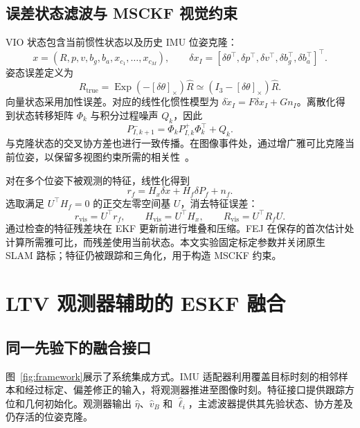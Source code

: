 \documentclass[a4paper,runningheads]{llncs}
\newcommand{\sk}[1]{[#1]_{\times}}
\newcommand{\Exp}{\operatorname{Exp}}
\begin{document}
\subsection{误差状态滤波与 MSCKF 视觉约束}
VIO 状态包含当前惯性状态以及历史 IMU 位姿克隆：
\begin{equation}
 x=(R,p,v,b_g,b_a,x_{c_1},\ldots,x_{c_M}),\qquad
 \delta x_I=[\delta\theta^\top,\delta p^\top,\delta v^\top,
              \delta b_g^\top,\delta b_a^\top]^\top .
\end{equation}
姿态误差定义为
\begin{equation}
 R_{\mathrm{true}}=\Exp(-\sk{\delta\theta})\hat R
       \simeq (I_3-\sk{\delta\theta})\hat R .
 \label{eq:attitudeerror}
\end{equation}
向量状态采用加性误差。对应的线性化惯性模型为 $\delta\dot x_I=F\delta x_I+Gn_I$。离散化得到状态转移矩阵 $\Phi_k$ 与积分过程噪声 $Q_k$，因此
\begin{equation}
 P_{I,k+1}^-=\Phi_kP_{I,k}^+\Phi_k^\top+Q_k .
 \label{eq:covprop}
\end{equation}
与克隆状态的交叉协方差也进行一致传播。在图像事件处，通过增广雅可比克隆当前位姿，以保留多视图约束所需的相关性~\cite{sun2018,geneva2020}。

对在多个位姿下被观测的特征，线性化得到
\begin{equation}
 r_f=H_x\delta x+H_f\delta P_f+n_f .
\end{equation}
选取满足 $U^\top H_f=0$ 的正交左零空间基 $U$，消去特征误差：
\begin{equation}
 r_{\mathrm{vis}}=U^\top r_f,\qquad
 H_{\mathrm{vis}}=U^\top H_x,\qquad
 R_{\mathrm{vis}}=U^\top R_fU .
 \label{eq:msckf}
\end{equation}
通过检查的特征残差块在 EKF 更新前进行堆叠和压缩。FEJ 在保存的首次估计处计算所需雅可比，而残差使用当前状态。本文实验固定标定参数并关闭原生 SLAM 路标；特征仍被跟踪和三角化，用于构造 MSCKF 约束。

\section{LTV 观测器辅助的 ESKF 融合}
\subsection{同一先验下的融合接口}
图~\ref{fig:framework}展示了系统集成方式。IMU 适配器利用覆盖目标时刻的相邻样本和经过标定、偏差修正的输入，将观测器推进至图像时刻。特征接口提供跟踪方位和几何初始化。观测器输出 $\hat\eta$、$\hat v_B$ 和 $\hat\ell_i$，主滤波器提供其先验状态、协方差及仍存活的位姿克隆。
\end{document}
